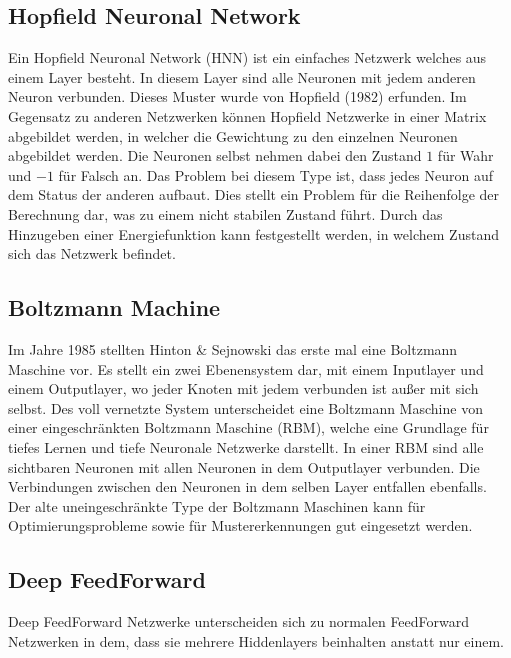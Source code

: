 \subsection{Hopfield Neuronal Network}

Ein Hopfield Neuronal Network (HNN) ist ein einfaches Netzwerk welches aus einem Layer besteht. 
In diesem Layer sind alle Neuronen mit jedem anderen Neuron verbunden. 
Dieses Muster wurde von Hopfield (1982) erfunden.
Im Gegensatz zu anderen Netzwerken können Hopfield Netzwerke in einer Matrix abgebildet werden, in welcher die Gewichtung zu den einzelnen Neuronen abgebildet werden. 
Die Neuronen selbst nehmen dabei den Zustand $1$ für Wahr und $-1$ für Falsch an.
Das Problem bei diesem Type ist, dass jedes Neuron auf dem Status der anderen aufbaut.
Dies stellt ein Problem für die Reihenfolge der Berechnung dar, was zu einem nicht stabilen Zustand führt.
Durch das Hinzugeben einer Energiefunktion kann festgestellt werden, in welchem Zustand sich das Netzwerk befindet.

\subsection{Boltzmann Machine}

Im Jahre 1985 stellten Hinton \& Sejnowski das erste mal eine Boltzmann Maschine vor.
Es stellt ein zwei Ebenensystem dar, mit einem Inputlayer und einem Outputlayer, wo jeder Knoten mit jedem verbunden ist außer mit sich selbst.
Des voll vernetzte System unterscheidet eine Boltzmann Maschine von einer eingeschränkten Boltzmann Maschine (RBM), welche eine Grundlage für tiefes Lernen und tiefe Neuronale Netzwerke darstellt.
In einer RBM sind alle sichtbaren Neuronen mit allen Neuronen in dem Outputlayer verbunden. 
Die Verbindungen zwischen den Neuronen in dem selben Layer entfallen ebenfalls.
Der alte uneingeschränkte Type der Boltzmann Maschinen kann für Optimierungsprobleme sowie für Mustererkennungen gut eingesetzt werden.


\subsection{Deep FeedForward}
\label{subsec:DeepFeedForward}

Deep FeedForward Netzwerke unterscheiden sich zu normalen FeedForward Netzwerken in dem, dass sie mehrere Hiddenlayers beinhalten anstatt nur einem.

